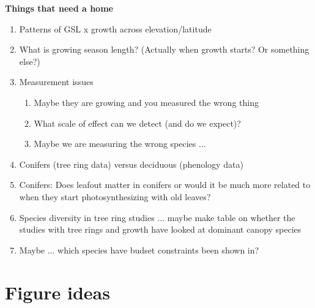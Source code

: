 \documentclass[11pt,letter]{article}
\begin{document}
{\bf Things that need a home}
\begin{enumerate}
\item Patterns of GSL x growth across elevation/latitude
\item What is growing season length? (Actually when growth starts? Or something else?) 
\item Measurement issues
\begin{enumerate}
\item Maybe they are growing and you measured the wrong thing
\item What scale of effect can we detect (and do we expect)?
\item Maybe we are measuring the wrong species ...
\end{enumerate}
\item Conifers (tree ring data) versus deciduous (phenology data)
\item Conifers: Does leafout matter in conifers or would it be much more related to when they start photosynthesizing with old leaves?
\item Species diversity in tree ring studies ... maybe make table on whether the studies with tree rings and growth have looked at dominant canopy species 
\item Maybe ... which species have budset constraints been shown in?
\end{enumerate}

\section{Figure ideas}
\end{document}
